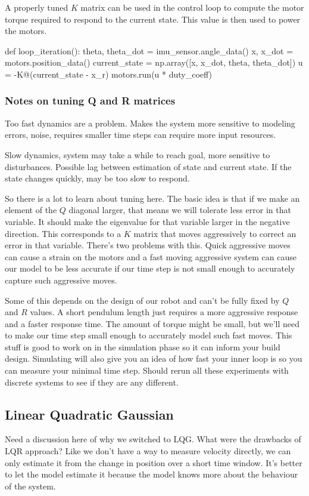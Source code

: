 \documentclass[]{article}
\begin{document}
A properly tuned $K$ matrix can be used in the control loop to compute the motor torque required to respond to the current state.  This value is then used to power the motors.
\vspace{\baselineskip}
\begin{python}
	def loop_iteration():
		theta, theta_dot = imu_sensor.angle_data()
		x, x_dot = motors.position_data()
		current_state = np.array([x, x_dot, theta, theta_dot])
		u = -K@(current_state - x_r)
		motors.run(u * duty_coeff)
\end{python}

\subsubsection*{Notes on tuning Q and R matrices}

Too fast dynamics are a problem. Makes the system more sensitive to modeling errors, noise, requires smaller time steps can require more input resources.

Slow dynamics, system may take a while to reach goal, more sensitive to disturbances. Possible lag between estimation of state and current state. If the state changes quickly, may be too slow to respond.


So there is a lot to learn about tuning here. The basic idea is that if we make an element of the $Q$ diagonal larger, that means we will tolerate less error in that variable.  It should make the eigenvalue for that variable larger in the negative direction. This corresponds to a $K$ matrix that moves aggressively to correct an error in that variable.  There's two problems with this. Quick aggressive moves can cause a strain on the motors and a fast moving aggressive system can cause our model to be less accurate if our time step is not small enough to accurately capture such aggressive moves.  

Some of this depends on the design of our robot and can't be fully fixed by $Q$ and $R$ values. A short pendulum length just requires a more aggressive response and a faster response time. The amount of torque might be small, but we'll need to make our time step small enough to accurately model such fast moves. This stuff is good to work on in the simulation phase so it can inform your build design. Simulating will also give you an idea of how fast your inner loop is so you can measure your minimal time step. Should rerun all these experiments with discrete systems to see if they are any different.

\subsection*{Linear Quadratic Gaussian}
Need a discussion here of why we switched to LQG. What were the drawbacks of LQR approach? Like we don't have a way to measure velocity directly, we can only estimate it from the change in position over a short time window.  It's better to let the model estimate it because the model knows more about the behaviour of the system.
\end{document}
